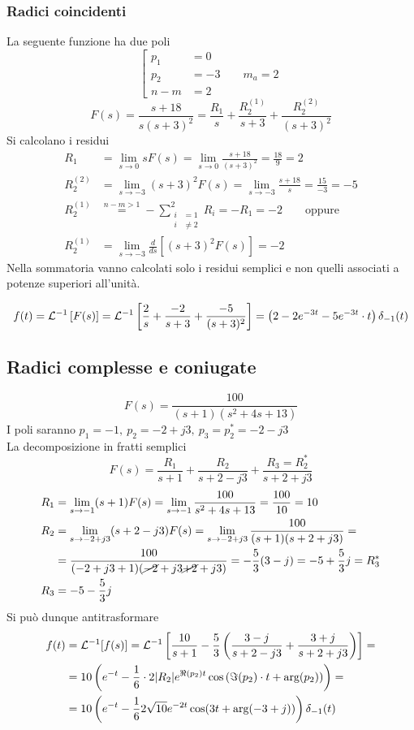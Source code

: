\subsubsection{Radici coincidenti}
La seguente funzione ha due poli
$$
\left[\begin{aligned}
p_1 &= 0\\
p_2 &= -3 \qquad m_a=2\\
n-m &=2
\end{aligned}\right.
$$
$$
F(s) = \frac{s+18}{s(s+3)^2} = \frac{R_1}{s} + \frac{R_2^{(1)}}{s+3} +
\frac{R_2^{(2)}}{(s+3)^2}
$$
Si calcolano i residui
$$\begin{aligned}
R_1 &= \lim_{s\to 0} sF(s) = \lim_{s\to 0} \frac{s+18}{(s+3)^2} = \frac{18}{9}
= 2\\
R_2^{(2)} &= \lim_{s\to -3} (s+3)^2 F(s) =
\lim_{s\to -3} \frac{s+18}{s} = \frac{15}{-3} = -5\\
R_2^{(1)} &\stackrel{n-m>1}{=} -\sum_{\begin{aligned}
i&=1\\ i &\neq 2
\end{aligned}}^2 R_i = -R_1 = -2 \qquad \text{oppure}\\
R_2^{(1)} & = \lim_{s\to -3} \frac{d}{ds} \left[(s+3)^2F(s)\right] = -2
\end{aligned}$$
Nella sommatoria vanno calcolati solo i residui semplici e non quelli associati
a potenze superiori all'unità.

$$
f(t) = \mathcal{L}^{-1}\left[F(s)\right] = \mathcal{L}^{-1} \left[\frac{2}{s} +
\frac{-2}{s+3} + \frac{-5}{(s+3)^2}\right] =
\left(2-2e^{-3t} -5e^{-3t}\cdot t\right)\delta_{-1}(t)
$$

\newpage
\subsection{Radici complesse e coniugate}
$$
F(s) = \frac{100}{(s+1)(s^2 + 4s + 13)}
$$
I poli saranno $p_1 = -1,\ p_2 = -2+j3,\ p_3 = p_2^* = -2-j3 $\\
La decomposizione in fratti semplici
$$
F(s) = \frac{R_1}{s+1} + \frac{R_2}{s+2-j3} + \frac{R_3=R_2^*}{s+2+j3}
$$
$$\begin{aligned}
R_1 &= \lim_{s\to -1} (s+1)F(s) = \lim_{s\to -1}\frac{100}{s^2+4s +13} =
\frac{100}{10} = 10\\
R_2 &= \lim_{s\to -2+j3} (s+2-j3)F(s) =\lim_{s\to -2+j3}
\frac{100}{(s+1)(s+2+j3)} = \\
&=\frac{100}{(-2 + j3 + 1)(\cancel{-2}+j3 \cancel{+
2} + j3)} = -\frac{5}{3}(3-j) = -5 + \frac{5}{3}j=R_3^*\\
R_3 &= -5 - \frac{5}{3}j
\end{aligned}$$
Si può dunque antitrasformare
$$\begin{aligned}
f(t) &= \mathcal{L}^{-1} [f(s)] = \mathcal{L}^{-1}
\left[
\frac{10}{s+1} - \frac{5}{3}\left(
\frac{3-j}{s+2-j3}+ \frac{3+j}{s+2+j3}
\right)
\right] = \\
&=10\left(e^{-t} -\frac{1}{6}\cdot
2|R_2|e^{\Re(p_2)t}\cos\left(\Im(p_2)\cdot t + \text{arg}(p_2)\right)
\right) = \\
&= 10\left(e^{-t} -\frac{1}{6}2\sqrt{10}e^{-2t} \cos(3t+
\text{arg}(-3+j))\right)\delta_{-1}(t)
\end{aligned}$$

